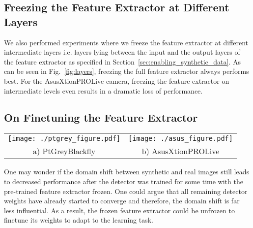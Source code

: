 \documentclass[10pt,twocolumn,letterpaper]{article}
\newcommand{\stefanrmk}[1]{{\color{DarkRed}\bf #1}}
\newcommand{\comment}[1]{}
\newcommand{\asus}[0]{AsusXtionPROLive\xspace}
\newcommand{\ptgrey}[0]{PtGreyBlackfly\xspace}
\begin{document}
\subsection{Freezing the Feature Extractor at Different Layers}
We also performed experiments where we freeze the feature extractor at different
intermediate layers i.e. layers lying between the input and the output layers of
the feature extractor as specified in Section~\ref{sec:enabling_synthetic_data}.
As can  be seen  in Fig.~\ref{fig:layers}, freezing  the full  feature extractor
always performs best.   For the \asus camera, freezing the  feature extractor on
intermediate levels even results in a dramatic loss of performance.





\subsection{On Finetuning the Feature Extractor}
\label{sec:unfreezing}

\begin{figure*}[ht]
\begin{center}
\begin{tabular}{cc}
\texttt{[image: ./ptgrey\_figure.pdf]} &
\texttt{[image: ./asus\_figure.pdf]} \\
a) \ptgrey &
b) \asus \\
\end{tabular}
\end{center}
\caption{\label{fig:incremental}  Finetuning the  feature extractor  after 400K,
  900K and 1200K steps where the pre-trained feature extractor was frozen for the \ptgrey and the \asus  cameras.  We show results
  for the InceptionResnet~\cite{inception_resnet} and Resnet101~\cite{resnet101}
  architectures.}
\end{figure*}

One may wonder if the domain shift between synthetic and real images still leads
to decreased performance  after the detector was trained for  some time with the
pre-trained feature extractor frozen.  One could argue that all remaining detector weights
have already started to converge and therefore, the domain shift \comment{does not matter
any more} is far less influential.  As a  result, the frozen feature extractor could  be unfrozen 
to finetune its weights to adapt to the learning task.
\end{document}
